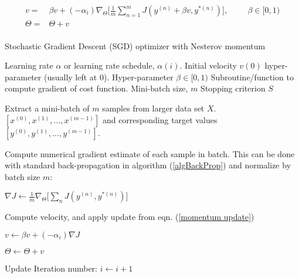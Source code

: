 \documentclass[12pt,letterpaper]{article}
\begin{document}
\begin{equation}
\label{Nesterov update}
\begin{split}
v =&  \beta v + (-\alpha_i)\nabla_{\Theta} \Big[ \frac{1}{m} \sum_{n=1}^{m} J(y^{(n)}+\beta v,y^{*(n)}) \Big] ,
\hspace{1cm} \beta \in [0,1) \\
\Theta =&  \Theta + v
\end{split} 
\end{equation}

\paragraph*{}

\begin{algorithm}
\caption{Stochastic Gradient Descent (SGD) optimizer with Nesterov momentum}
\label{algSGD}

\begin{algorithmic}

\REQUIRE Learning rate $\alpha$ or learning rate schedule, $\alpha(i)$.
\REQUIRE Initial velocity $v(0)$ hyper-parameter (usually left at $0$).
\REQUIRE Hyper-parameter $\beta \in [0,1)$
\REQUIRE Subroutine/function to compute gradient of cost function.
\REQUIRE Mini-batch size, $m$
\REQUIRE Stopping criterion $S$

	\item Extract a mini-batch of $m$ samples from larger data set $X$. $[x^{(0)},x^{(1)},...,x^{(m-1)}]$ and corresponding target values 
	$[y^{(0)},y^{(1)},...,y^{(m-1)}]$.
	\item Compute numerical gradient estimate of each sample in batch. This can be done with standard back-propagation in algorithm (\ref{algBackProp}) and 			 	normalize by batch size $m$:
	\item $\nabla J \leftarrow \frac{1}{m}\nabla_{\Theta} \Big[ \sum_n J(y^{(n)},y^{*(n)}) \Big] $
	\item Compute velocity, and apply update from eqn. (\ref{momentum update})
	\item $v \leftarrow \beta v + (-\alpha_i)\nabla J$
	\item $\Theta \leftarrow \Theta + v$
	\item Update Iteration number: $i \leftarrow i + 1$
\ENDWHILE

\end{algorithmic}
\end{algorithm}


\end{document}
